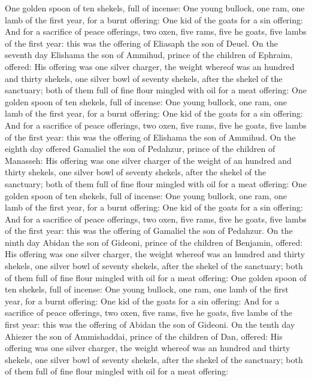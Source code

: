 \begin{biblechapter}
\verse One golden spoon of ten shekels, full of incense:
\verse One young bullock, one ram, one lamb of the first year, for a burnt offering:
\verse One kid of the goats for a sin offering:
\verse And for a sacrifice of peace offerings, two oxen, five rams, five he goats, five lambs of the first year: this was the offering of Eliasaph the son of Deuel.
\verse On the seventh day Elishama the son of Ammihud, prince of the children of Ephraim, offered:
\verse His offering was one silver charger, the weight whereof was an hundred and thirty shekels, one silver bowl of seventy shekels, after the shekel of the sanctuary; both of them full of fine flour mingled with oil for a meat offering:
\verse One golden spoon of ten shekels, full of incense:
\verse One young bullock, one ram, one lamb of the first year, for a burnt offering:
\verse One kid of the goats for a sin offering:
\verse And for a sacrifice of peace offerings, two oxen, five rams, five he goats, five lambs of the first year: this was the offering of Elishama the son of Ammihud.
\verse On the eighth day offered Gamaliel the son of Pedahzur, prince of the children of Manasseh:
\verse His offering was one silver charger of the weight of an hundred and thirty shekels, one silver bowl of seventy shekels, after the shekel of the sanctuary; both of them full of fine flour mingled with oil for a meat offering:
\verse One golden spoon of ten shekels, full of incense:
\verse One young bullock, one ram, one lamb of the first year, for a burnt offering:
\verse One kid of the goats for a sin offering:
\verse And for a sacrifice of peace offerings, two oxen, five rams, five he goats, five lambs of the first year: this was the offering of Gamaliel the son of Pedahzur.
\verse On the ninth day Abidan the son of Gideoni, prince of the children of Benjamin, offered:
\verse His offering was one silver charger, the weight whereof was an hundred and thirty shekels, one silver bowl of seventy shekels, after the shekel of the sanctuary; both of them full of fine flour mingled with oil for a meat offering:
\verse One golden spoon of ten shekels, full of incense:
\verse One young bullock, one ram, one lamb of the first year, for a burnt offering:
\verse One kid of the goats for a sin offering:
\verse And for a sacrifice of peace offerings, two oxen, five rams, five he goats, five lambs of the first year: this was the offering of Abidan the son of Gideoni.
\verse On the tenth day Ahiezer the son of Ammishaddai, prince of the children of Dan, offered:
\verse His offering was one silver charger, the weight whereof was an hundred and thirty shekels, one silver bowl of seventy shekels, after the shekel of the sanctuary; both of them full of fine flour mingled with oil for a meat offering:

\end{biblechapter}
